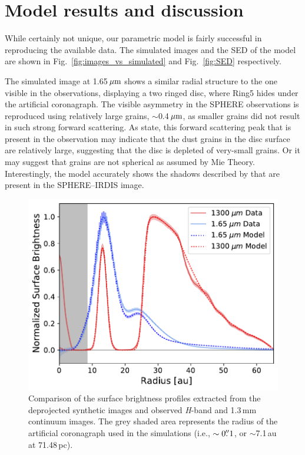 \documentclass[usenatbib,times]{mnras}
\begin{document}
\section{Model results and discussion} \label{sec:results}

While certainly not unique, our parametric model is fairly successful in reproducing the available data. The simulated images and the SED of the model are shown in Fig.~\ref{fig:images_vs_simulated} and Fig.~\ref{fig:SED} respectively.

The simulated image at 1.65\,$\hbox{$\mu$m}$ shows a similar radial structure to the one visible in the observations, displaying a two ringed disc, where Ring5 hides under the artificial coronagraph. The visible asymmetry in the SPHERE observations is reproduced using relatively large grains, $\sim$0.4\,$\hbox{$\mu$m}$, as smaller grains did not result in such strong forward scattering. As \citet{refId0} state, this forward scattering peak that is present in the observation may indicate that the dust grains in the disc surface are relatively large, suggesting that the disc is depleted of very-small grains. Or it may suggest that grains are not spherical as assumed by Mie Theory. Interestingly, the model accurately shows the shadows described by \citet{dOrazi} that are present in the SPHERE--IRDIS image.  

\begin{figure}
	\includegraphics[width=\columnwidth]{comp_fig_all_profiles_au.pdf}
    \caption{Comparison of the surface brightness profiles extracted from the deprojected synthetic images and observed \textit{H}-band and 1.3\,mm continuum images. The grey shaded area represents the radius of the artificial coronagraph used in the simulations (i.e., $\sim0\hbox{$.\!\!^{\prime\prime}$} 1$, or $\sim$7.1\,au at 71.48\,pc).}
    \label{fig:radprofiles}
\end{figure}
\end{document}
